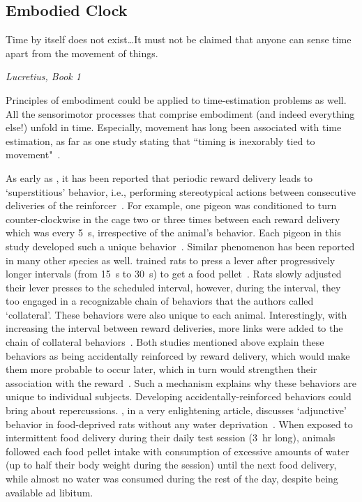 \subsection{Embodied Clock}
\label{ch:intro:Embodiment:Embodied Clock}
\epigraph{Time by itself does not exist\ldots It must not be claimed that anyone can sense time apart from the movement of things.}
{\textit{Lucretius, Book 1}}
\noindent
Principles of embodiment could be applied to time-estimation problems as well.
All the sensorimotor processes that comprise embodiment (and indeed everything else!) unfold in time.
Especially, movement has long been associated with time estimation, as far as one study stating that ``timing is inexorably tied to movement"~\cite{Wiener2019eNeuro}.
\par
As early as \citeyear{Skinner1948}, it has been reported that periodic reward delivery leads to `superstitious' behavior, i.e., performing stereotypical actions between consecutive deliveries of the reinforcer~\cite{Skinner1948}.
For example, one pigeon was conditioned to turn counter-clockwise in the cage two or three times between each reward delivery which was every 5~s, irrespective of the animal's behavior.
Each pigeon in this study developed such a unique behavior~\cite{Skinner1948}.
Similar phenomenon has been reported in many other species as well.
 trained rats to press a lever after progressively longer intervals (from 15~s to 30~s) to get a food pellet~\cite{Wilson1953}.
Rats slowly adjusted their lever presses to the scheduled interval, however, during the interval, they too engaged in a recognizable chain of behaviors that the authors called `collateral'.
These behaviors were also unique to each animal.
Interestingly, with increasing the interval between reward deliveries, more links were added to the chain of collateral behaviors~\cite{Wilson1953}.
Both studies mentioned above explain these behaviors as being accidentally reinforced by reward delivery, which would make them more probable to occur later, which in turn would strengthen their association with the reward~\cite{Killeen1988}.
Such a mechanism explains why these behaviors are unique to individual subjects.
Developing accidentally-reinforced behaviors could bring about repercussions.
, in a very enlightening article, discusses `adjunctive' behavior in food-deprived rats without any water deprivation~\cite{Falk1971}.
When exposed to intermittent food delivery during their daily test session (3~hr long), animals followed each food pellet intake with consumption of excessive amounts of water (up to half their body weight during the session) until the next food delivery, while almost no water was consumed during the rest of the day, despite being available ad libitum.
